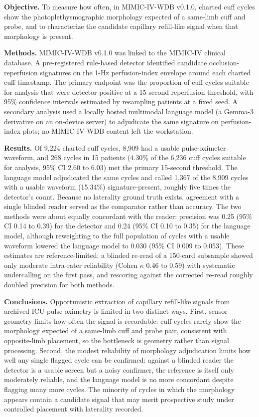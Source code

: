 \documentclass[twocolumn,letterpaper,10pt]{article}
\begin{document}
  \textbf{Objective.} To measure how often, in MIMIC-IV-WDB v0.1.0, charted cuff cycles show the photoplethysmographic morphology expected of a same-limb cuff and probe, and to characterize the candidate capillary refill-like signal when that morphology is present.

  \textbf{Methods.} MIMIC-IV-WDB v0.1.0\cite{moody2022_wdb} was linked to the MIMIC-IV clinical database.\cite{johnson2023_mimic4} A pre-registered rule-based detector identified candidate occlusion-reperfusion signatures on the 1-Hz perfusion-index envelope around each charted cuff timestamp. The primary endpoint was the proportion of cuff cycles suitable for analysis that were detector-positive at a 15-second reperfusion threshold, with 95\% confidence intervals estimated by resampling patients at a fixed seed. A secondary analysis used a locally hosted multimodal language model (a Gemma-3 derivative on an on-device server) to adjudicate the same signature on perfusion-index plots; no MIMIC-IV-WDB content left the workstation.

  \textbf{Results.} Of 9{,}224 charted cuff cycles, 8{,}909 had a usable pulse-oximeter waveform, and 268 cycles in 15 patients (4.30\% of the 6{,}236 cuff cycles suitable for analysis, 95\% CI 2.60 to 6.03) met the primary 15-second threshold. The language model adjudicated the same cycles and called 1{,}367 of the 8{,}909 cycles with a usable waveform (15.34\%) signature-present, roughly five times the detector's count. Because no laterality ground truth exists, agreement with a single blinded reader served as the comparator rather than accuracy. The two methods were about equally concordant with the reader: precision was 0.25 (95\% CI 0.14 to 0.39) for the detector and 0.24 (95\% CI 0.10 to 0.35) for the language model, although reweighting to the full population of cycles with a usable waveform lowered the language model to 0.030 (95\% CI 0.009 to 0.053). These estimates are reference-limited: a blinded re-read of a 150-card subsample showed only moderate intra-rater reliability (Cohen $\kappa$ 0.46 to 0.59) with systematic undercalling on the first pass, and rescoring against the corrected re-read roughly doubled precision for both methods.

  \textbf{Conclusions.} Opportunistic extraction of capillary refill-like signals from archived ICU pulse oximetry is limited in two distinct ways. First, sensor geometry limits how often the signal is recordable: cuff cycles rarely show the morphology expected of a same-limb cuff and probe pair, consistent with opposite-limb placement, so the bottleneck is geometry rather than signal processing. Second, the modest reliability of morphology adjudication limits how well any single flagged cycle can be confirmed: against a blinded reader the detector is a usable screen but a noisy confirmer, the reference is itself only moderately reliable, and the language model is no more concordant despite flagging many more cycles. The minority of cycles in which the morphology appears contain a candidate signal that may merit prospective study under controlled placement with laterality recorded.
\end{document}
